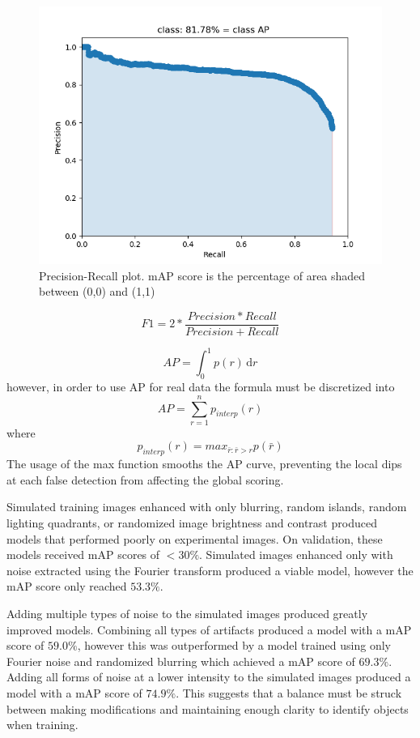 \documentclass[prl,reprint,showpacs,floatfix,nofootinbib]{revtex4-1}
\begin{document}
\begin{figure}
  \includegraphics[width=\linewidth]{mAPCurve.png}
  \caption{Precision-Recall plot. mAP score is the percentage of area shaded between (0,0) and (1,1)}
  \label{fig:mAP score}
\end{figure}


$$ F1 = 2*\frac{Precision * Recall}{Precision + Recall} $$

$$ AP = \int_0^1 \!p(r) \, \mathrm{d}r $$
however, in order to use AP for real data the formula must be discretized into
$$AP = \sum_{r=1}^{n} p_{interp}(r)  $$
where
$$ p_{interp}(r) = max_{\bar{r}:\bar{r}>r} p(\bar{r})  $$
The usage of the max function smooths the AP curve, preventing the local dips at each false detection from affecting the global scoring.

Simulated training images enhanced with only blurring, random islands, random lighting quadrants, or randomized image brightness and contrast produced models that performed poorly on experimental images. On validation, these models received mAP scores of $<30\%$. Simulated images enhanced only with noise extracted using the Fourier transform produced a viable model, however the mAP score only reached $53.3\%$.

Adding multiple types of noise to the simulated images produced greatly improved models. Combining all types of artifacts produced a model with a mAP score of $59.0\%$, however this was outperformed by a model trained using only Fourier noise and randomized blurring which achieved a mAP score of $69.3\%$. Adding all forms of noise at a lower intensity to the simulated images produced a model with a mAP score of $74.9\%$. This suggests that a balance must be struck between making modifications and maintaining enough clarity to identify objects when training.
\end{document}
